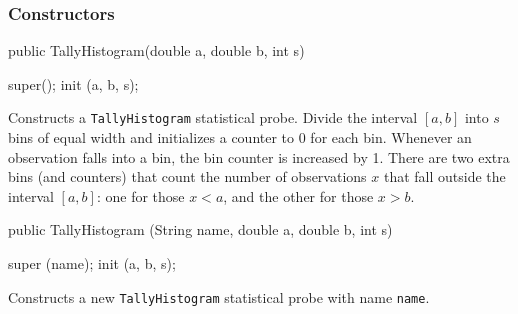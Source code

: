 \subsubsection* {Constructors}
\begin{code}

   public TallyHistogram(double a, double b, int s) \begin{hide} {
      super();
      init (a, b, s);
   }\end{hide}
\end{code}
\begin{tabb}  Constructs a \texttt{TallyHistogram} statistical probe.
Divide the interval $[a,b]$ into $s$ bins of equal width and initializes
a counter to 0 for each bin. Whenever an observation falls into a bin,
the bin counter is increased by 1. There are two extra bins (and counters)
that count the number of observations $x$ that fall outside the interval
$[a,b]$: one for those $x< a$, and the other for  those $x > b$.
\end{tabb}
\begin{htmlonly}
\end{htmlonly}
\begin{code}

   public TallyHistogram (String name, double a, double b, int s) \begin{hide} {
      super (name);
      init (a, b, s);
   }\end{hide}
\end{code}
\begin{tabb} Constructs a new \texttt{TallyHistogram} statistical probe with
name \texttt{name}.
\end{tabb}
\begin{htmlonly}
\end{htmlonly}


